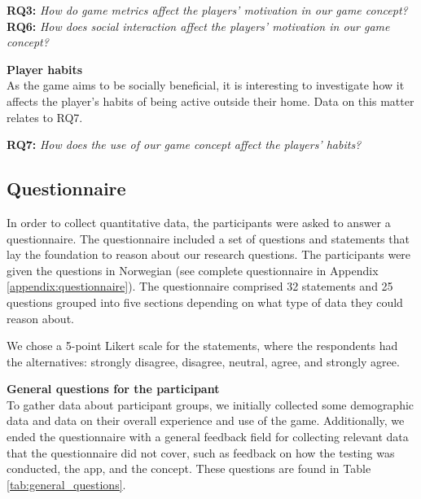 \textbf{RQ3:} \textit{How do game metrics affect the players’ motivation in our game concept?}
\textbf{RQ6:} \textit{How does social interaction affect the players’ motivation in our game concept?}

\textbf{Player habits}\\
As the game aims to be socially beneficial, it is interesting to investigate how it affects the player’s habits of being active outside their home. Data on this matter relates to RQ7.

\textbf{RQ7:} \textit{How does the use of our game concept affect the players’ habits?}

\subsection{Questionnaire}
In order to collect quantitative data, the participants were asked to answer a questionnaire. The questionnaire included a set of questions and statements that lay the foundation to reason about our research questions. The participants were given the questions in Norwegian (see complete questionnaire in Appendix \ref{appendix:questionnaire}). The questionnaire comprised 32 statements and 25 questions grouped into five sections depending on what type of data they could reason about.

We chose a 5-point Likert scale for the statements, where the respondents had the alternatives: strongly disagree, disagree, neutral, agree, and strongly agree.

\textbf{General questions for the participant}\\
To gather data about participant groups, we initially collected some demographic data and data on their overall experience and use of the game. Additionally, we ended the questionnaire with a general feedback field for collecting relevant data that the questionnaire did not cover, such as feedback on how the testing was conducted, the app, and the concept. These questions are found in Table \ref{tab:general_questions}.



